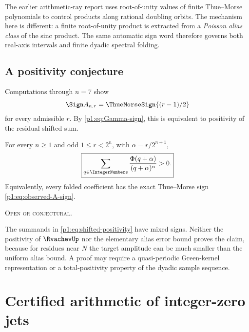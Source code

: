\documentclass[11pt,oneside]{article}
\theoremstyle{definition}
\theoremstyle{remark}
\newcommand{\PhiU}{\Phi}
\newcommand{\openstatus}{\textcolor{conjectureorange}{\textsc{Open or conjectural.}}}
\begin{document}
\begin{remark}
The earlier arithmetic-ray report uses root-of-unity values of finite
Thue--Morse polynomials to control products along rational doubling orbits.  The
mechanism here is different: a finite root-of-unity product is extracted from a
\emph{Poisson alias class} of the sinc product.  The same automatic sign word
therefore governs both real-axis intervals and finite dyadic spectral folding.
\end{remark}

\subsection{A positivity conjecture}

Computations through $n=7$ show
\begin{equation}\label{p1:eq:observed-A-sign}
 \Sign A_{n,r}=\ThueMorseSign{(r-1)/2}
\end{equation}
for every admissible $r$.  By \eqref{p1:eq:Gamma-sign}, this is equivalent to
positivity of the residual shifted sum.

\begin{conjecture}\label{p1:conj:shifted-positivity}
For every $n\ge1$ and odd $1\le r<2^n$, with
$\alpha=r/2^{n+1}$,
\begin{equation}\label{p1:eq:shifted-positivity}
 \boxed{
 \sum_{q\in\IntegerNumbers}\frac{\PhiU(q+\alpha)}{(q+\alpha)^n}>0.}
\end{equation}
Equivalently, every folded coefficient has the exact Thue--Morse sign
\eqref{p1:eq:observed-A-sign}.

\smallskip\noindent\openstatus
\end{conjecture}

\begin{remark}
The summands in \eqref{p1:eq:shifted-positivity} have mixed signs.  Neither the
positivity of $\RvachevUp$ nor the elementary alias error bound proves the claim,
because for residues near $N$ the target amplitude can be much smaller than the
uniform alias bound.  A proof may require a quasi-periodic Green-kernel
representation or a total-positivity property of the dyadic sample sequence.
\end{remark}

\section{Certified arithmetic of integer-zero jets}\label{p1:sec:zero-jets}
\end{document}
